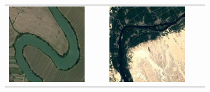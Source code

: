\begin{figure}[h]
\begin{tabular}{|p{0.4\linewidth}p{0.4\linewidth}|}
\includegraphics[width=\linewidth,frame]{figures/examples_assests/linear_probing/river_3.pdf} & 
\includegraphics[width=\linewidth,frame]{figures/examples_assests/linear_probing/river_4.pdf} \\

\end{tabular}
\end{figure}
